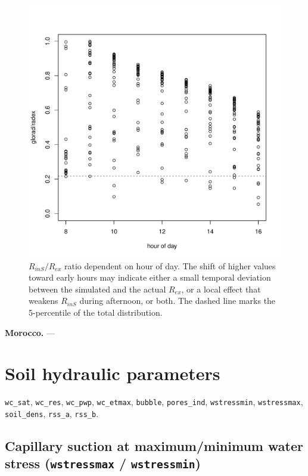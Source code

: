 \documentclass{scrreprt}
\begin{document}
\begin{figure}[ht]
  \centering
  \includegraphics[width=0.6\hsize]{./plot_radex2.pdf}
  \caption{$R_{inS}/R_{ex}$ ratio dependent on hour of day.
           The shift of higher values toward early hours may indicate either a small temporal deviation between the simulated and the actual $R_{ex}$, or a local effect that weakens $R_{inS}$ during afternoon, or both.
           The dashed line marks the 5-percentile of the total distribution.}
  \label{fig:portugal_radex2}
\end{figure}

\textbf{Morocco.}
---

\section{Soil hydraulic parameters} \label{sec:parest_soil}

\verb!wc_sat!, \verb!wc_res!, \verb!wc_pwp!, \verb!wc_etmax!, \verb!bubble!, \verb!pores_ind!, \verb!wstressmin!, \verb!wstressmax!, \verb!soil_dens!, \verb!rss_a!, \verb!rss_b!.

\subsection{Capillary suction at maximum/minimum water stress (\texttt{wstressmax} / \texttt{wstressmin})}
\end{document}
